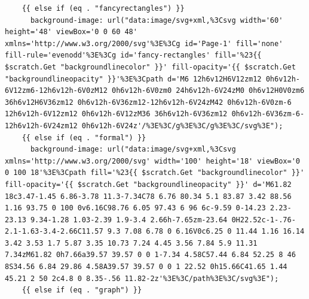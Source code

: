 \documentclass[11pt]{article}
\begin{document}
\begin{enumerate}
\begin{verbatim}
    {{ else if (eq . "fancyrectangles") }}
      background-image: url("data:image/svg+xml,%3Csvg width='60' height='48' viewBox='0 0 60 48' xmlns='http://www.w3.org/2000/svg'%3E%3Cg id='Page-1' fill='none' fill-rule='evenodd'%3E%3Cg id='fancy-rectangles' fill='%23{{ $scratch.Get "backgroundlinecolor" }}' fill-opacity='{{ $scratch.Get "backgroundlineopacity" }}'%3E%3Cpath d='M6 12h6v12H6V12zm12 0h6v12h-6V12zm6-12h6v12h-6V0zM12 0h6v12h-6V0zm0 24h6v12h-6V24zM0 0h6v12H0V0zm6 36h6v12H6V36zm12 0h6v12h-6V36zm12-12h6v12h-6V24zM42 0h6v12h-6V0zm-6 12h6v12h-6V12zm12 0h6v12h-6V12zM36 36h6v12h-6V36zm12 0h6v12h-6V36zm-6-12h6v12h-6V24zm12 0h6v12h-6V24z'/%3E%3C/g%3E%3C/g%3E%3C/svg%3E");
    {{ else if (eq . "formal") }}
      background-image: url("data:image/svg+xml,%3Csvg xmlns='http://www.w3.org/2000/svg' width='100' height='18' viewBox='0 0 100 18'%3E%3Cpath fill='%23{{ $scratch.Get "backgroundlinecolor" }}' fill-opacity='{{ $scratch.Get "backgroundlineopacity" }}' d='M61.82 18c3.47-1.45 6.86-3.78 11.3-7.34C78 6.76 80.34 5.1 83.87 3.42 88.56 1.16 93.75 0 100 0v6.16C98.76 6.05 97.43 6 96 6c-9.59 0-14.23 2.23-23.13 9.34-1.28 1.03-2.39 1.9-3.4 2.66h-7.65zm-23.64 0H22.52c-1-.76-2.1-1.63-3.4-2.66C11.57 9.3 7.08 6.78 0 6.16V0c6.25 0 11.44 1.16 16.14 3.42 3.53 1.7 5.87 3.35 10.73 7.24 4.45 3.56 7.84 5.9 11.31 7.34zM61.82 0h7.66a39.57 39.57 0 0 1-7.34 4.58C57.44 6.84 52.25 8 46 8S34.56 6.84 29.86 4.58A39.57 39.57 0 0 1 22.52 0h15.66C41.65 1.44 45.21 2 50 2c4.8 0 8.35-.56 11.82-2z'%3E%3C/path%3E%3C/svg%3E");
    {{ else if (eq . "graph") }}

\end{verbatim}
\end{enumerate}
\end{document}
